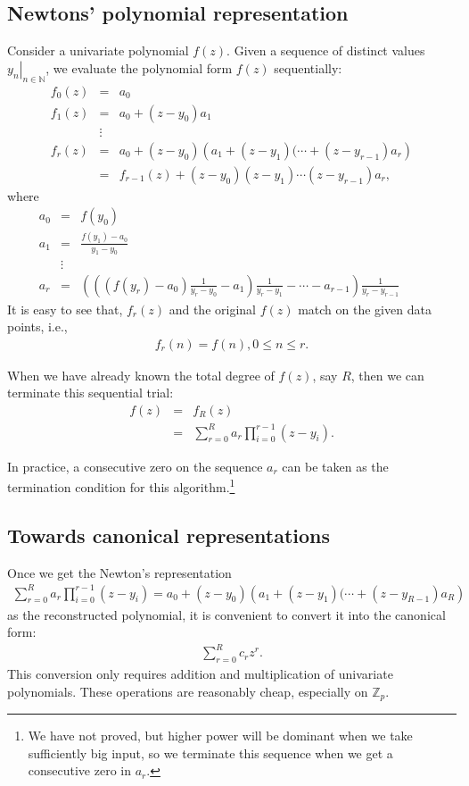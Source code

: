 \documentclass[11pt]{book}
\begin{document}
\subsection{Newtons' polynomial representation}
Consider a univariate polynomial $f(z)$.
Given a sequence of distinct values $\left. y_n \right|_{n \in \mathbb{N}}$, we evaluate the polynomial form $f(z)$ sequentially:
\begin{eqnarray}
f_0(z) &=& a_0 \\
f_1(z) &=& a_0 + (z-y_0)a_1 \\
\nonumber
&\vdots& \\
f_r(z) &=& a_0 + (z-y_0) \left(a_1 + (z-y_1)(\cdots + (z - y_{r-1})a_r \right) \\
&=& f_{r-1}(z) + (z-y_0) (z-y_1) \cdots (z - y_{r-1})a_r,
\end{eqnarray}
where
\begin{eqnarray}
a_0 &=& f(y_0) \\
a_1 &=& \frac{f(y_1) - a_0}{y_1 - y_0} \\
\nonumber
&\vdots& \\
a_r &=& \left( \left( \left( f(y_r)-a_0 \right)\frac{1}{y_r - y_0} - a_1 \right)\frac{1}{y_r - y_1} - \cdots - a_{r-1} \right) \frac{1}{y_r - y_{r-1}} \qquad
\end{eqnarray}
It is easy to see that, $f_r(z)$ and the original $f(z)$ match on the given data points, i.e.,
\begin{eqnarray}
f_r(n) = f(n), 0 \leq n \leq r.
\end{eqnarray}

When we have already known the total degree of $f(z)$, say $R$, then we can terminate this sequential trial:
\begin{eqnarray}
f(z) &=& f_R(z) \\
&=& \sum_{r=0}^R a_r \prod_{i=0}^{r-1}(z - y_i).
\end{eqnarray}

In practice, a consecutive zero on the sequence $a_r$ can be taken as the termination condition for this algorithm.\footnote{
We have not proved, but higher power will be dominant when we take sufficiently big input, so we terminate this sequence when we get a consecutive zero in $a_r$.
}

\subsection{Towards canonical representations}
Once we get the Newton's representation
\begin{eqnarray}
\sum_{r=0}^R a_r \prod_{i=0}^{r-1}(z - y_i) = a_0 + (z-y_0) \left(a_1 + (z-y_1)(\cdots + (z - y_{R-1})a_R \right) \quad
\end{eqnarray}
as the reconstructed polynomial, it is convenient to convert it into the canonical form:
\begin{eqnarray}
\sum_{r=0}^R c_r z^r.
\end{eqnarray}
This conversion only requires addition and multiplication of univariate polynomials.
These operations are reasonably cheap, especially on $\mathbb{Z}_p$. 
\end{document}
